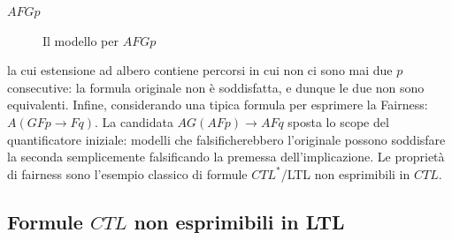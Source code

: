 \begin{example}{\(A FGp\)}
  \begin{figure}[H]
    \centering
    \caption{Il modello per \(A FGp\)}\label{fig:ctl-afgp-model-2}
  \end{figure}
   
   la cui estensione ad albero contiene percorsi in cui non ci sono mai due \(p\) consecutive: la formula originale non è soddisfatta, e dunque le due non sono equivalenti.
\newline
  Infine, considerando una tipica formula per esprimere la Fairness: \(A(GFp\to Fq)\).
  La candidata \(AG(AF p) \to AFq\) sposta lo scope del quantificatore iniziale: modelli che falsificherebbero l'originale possono soddisfare la seconda semplicemente falsificando la premessa dell'implicazione. Le proprietà di fairness sono l'esempio classico di formule \(CTL^*\)/LTL non esprimibili in \(CTL\)\@.
\end{example}

\subsection{Formule \(CTL\) non esprimibili in LTL}

